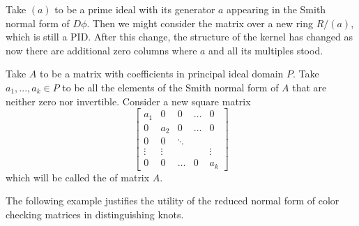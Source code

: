 Take $(a)$ to be a prime ideal with its generator $a$ appearing in the Smith normal form of $D\phi$. Then we might consider the matrix over a new ring $R/(a)$, which is still a PID. After this change, the structure of the kernel has changed as now there are additional zero columns where $a$ and all its multiples stood.

\begin{definition}
  Take $A$ to be a matrix with coefficients in principal ideal domain $P$. Take $a_1,...,a_k\in P$ to be all the elements of the Smith normal form of $A$ that are neither zero nor invertible. Consider a new square matrix 
  $$
  \begin{bmatrix}
    a_1 & 0 & 0 & \hdots & 0\\ 
    0 & a_2 & 0 & \hdots & 0 \\ 
    0 & 0 & \ddots & &  \\ 
    \vdots & \vdots & & & \vdots \\ 
    0 & 0 & \hdots & 0 & a_k
  \end{bmatrix}
  $$
  which will be called the  of matrix $A$.
\end{definition}

The following example justifies the utility of the reduced normal form of color checking matrices in distinguishing knots.

